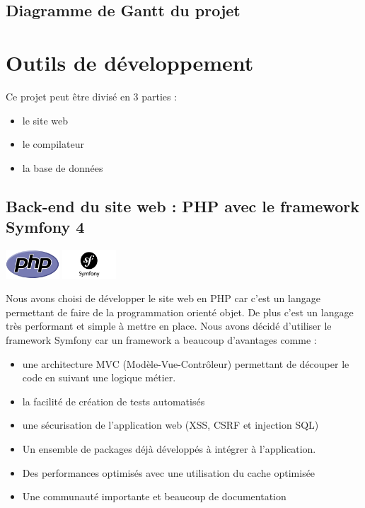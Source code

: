 \documentclass[12pt,a4paper]{article}
\begin{document}
\subsection{Diagramme de Gantt du projet}

\section{Outils de développement}

Ce projet peut être divisé en 3 parties :
\begin{itemize}  
  \item le site web
  \item le compilateur 
  \item la base de données
\end{itemize}

\subsection{Back-end du site web : PHP avec le framework Symfony 4}
\begin{center}
  \includegraphics[width=2cm]{img/php.png}
  \includegraphics[width=2cm]{img/symfony.png}
\end{center}

Nous avons choisi de développer le site web en PHP car c'est un langage permettant de faire de la programmation orienté objet. 
De plus c'est un langage très performant et simple à mettre en place.
Nous avons décidé d'utiliser le framework Symfony car un framework a beaucoup d'avantages comme :
\begin{itemize}  
  \item une architecture MVC (Modèle-Vue-Contrôleur) permettant de découper le code en suivant une logique métier.
  \item la facilité de création de tests automatisés
  \item une sécurisation de l'application web (XSS, CSRF et injection SQL)
  \item Un ensemble de packages déjà développés à intégrer à l'application.
  \item Des performances optimisés avec une utilisation du cache optimisée
  \item Une communauté importante et beaucoup de documentation
\end{itemize}
\end{document}
